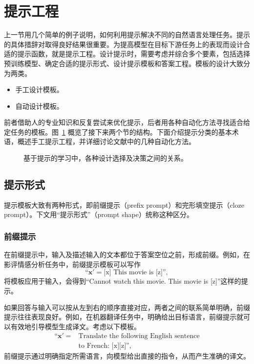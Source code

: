 \section{提示工程}
上一节用几个简单的例子说明，如何利用提示解决不同的自然语言处理任务。提示的具体措辞对取得良好结果很重要。为提高模型在目标下游任务上的表现而设计合适的提示函数，就是提示工程。设计提示时，需要考虑并综合多个要素，包括选择预训练模型、确定合适的提示形式、设计提示模板和答案工程。模板的设计大致分为两类。
\begin{itemize}
\item 手工设计模板。
\item 自动设计模板。
\end{itemize}
前者借助人的专业知识和反复尝试来优化提示，后者用各种自动化方法寻找适合给定任务的模板。图~\ref{fig:ch03-design} 概览了接下来两个节的结构。下面介绍提示分类的基本术语，概述手工提示工程，并详细讨论文献中的几种自动化方法。

\begin{figure}[!htbp]
\centering

\caption{基于提示的学习中，各种设计选择及决策之间的关系。}
\label{fig:ch03-design}
\end{figure}

\subsection{提示形式}
提示模板大致有两种形式，即前缀提示（prefix prompt）和完形填空提示（cloze prompt）。下文用“提示形式”（prompt shape）统称这种区分。

\subsubsection{前缀提示}
在前缀提示中，输入及描述输入的文本都位于答案空位之前，形成前缀。例如，在影评情感分析任务中，前缀提示模板可以写作
\begin{equation}
\text{“}\symbf{x}'=\text{[x] This movie is [z]}\text{”},
\tag{3.5}
\end{equation}
将模板应用于输入，会得到“Cannot watch this movie. This movie is [z]”这样的提示。

如果回答与输入可以按从左到右的顺序直接对应，两者之间的联系简单明确，前缀提示往往表现良好。例如，在机器翻译任务中，明确给出目标语言，前缀提示就可以有效地引导模型生成译文。考虑以下模板。
\begin{equation}
\begin{aligned}
\text{“}\symbf{x}'={}&\text{Translate the following English sentence}\\
 &\text{to French: [x][z]}\text{”},
\end{aligned}
\tag{3.6}
\end{equation}
前缀提示通过明确指定所需语言，向模型给出直接的指令，从而产生准确的译文。

